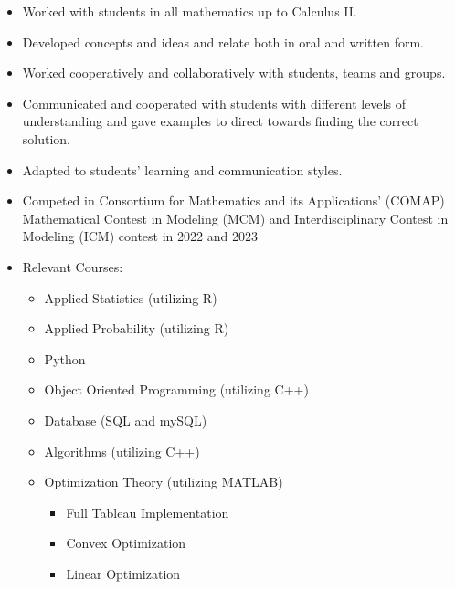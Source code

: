 \documentclass[10pt,a4paper,ragged2e,withhyper]{altacv}
\begin{document}
\begin{paracol}{2}
            \begin{itemize}
                \item Worked with students in all 
                mathematics up to Calculus II.
                \item Developed concepts and ideas 
                and relate both in oral and written form.
                \item Worked cooperatively and collaboratively with students, teams and groups.
                \item Communicated and cooperated with 
                students with different levels of 
                understanding and gave examples to direct 
                towards finding the correct solution.
                \item Adapted to students' learning and communication styles.

            \end{itemize}
        
        
            \begin{itemize}
                \item Competed in Consortium for Mathematics and its Applications’ (COMAP)
                  Mathematical Contest in Modeling (MCM) and Interdisciplinary Contest in Modeling
                  (ICM) contest in 2022 and 2023 
                \item Relevant Courses:
                \begin{itemize}
                	\item Applied Statistics (utilizing R)
                	\item Applied Probability (utilizing R)
                	\item Python
                	\item Object Oriented Programming (utilizing C++)
                	\item Database (SQL and mySQL)
                	\item Algorithms (utilizing C++)
                	\item Optimization Theory (utilizing MATLAB)
                	\begin{itemize}
                		\item Full Tableau Implementation
                		\item Convex Optimization
                		\item Linear Optimization
                	\end{itemize}
                \end{itemize}
            \end{itemize}
            

\end{paracol}
\end{document}
